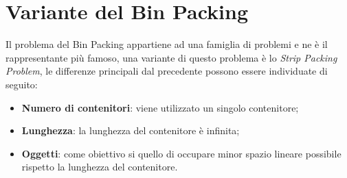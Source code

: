 \section{Variante del Bin Packing}
Il problema del Bin Packing appartiene ad una famiglia di problemi e ne è il rappresentante più famoso, una variante di questo problema è lo \textit{Strip Packing Problem}, le differenze principali dal precedente possono essere individuate di seguito:
\begin{itemize}
    \item \textbf{Numero di contenitori}: viene utilizzato un singolo contenitore;
    \item \textbf{Lunghezza}: la lunghezza del contenitore è infinita;
    \item \textbf{Oggetti}: come obiettivo si quello di occupare minor spazio lineare possibile rispetto la lunghezza del contenitore.
\end{itemize}
